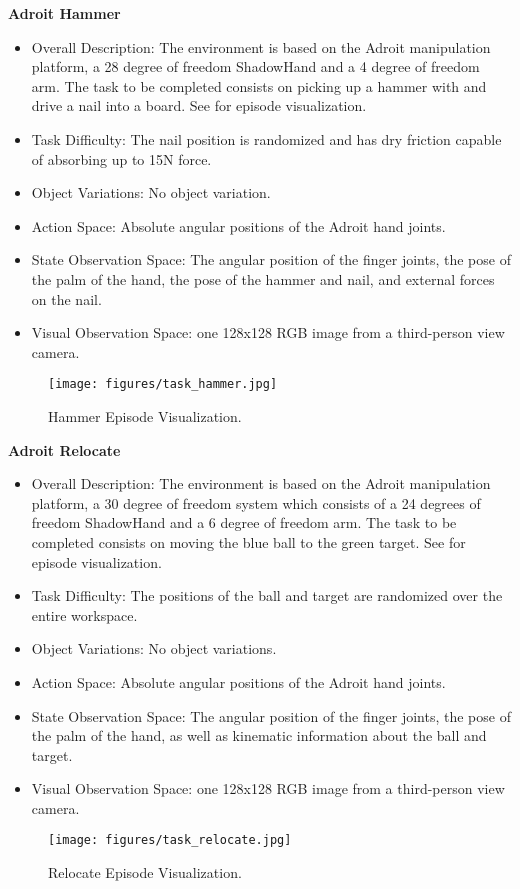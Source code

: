 \textbf{Adroit Hammer}
\begin{itemize}
    \item Overall Description: The environment is based on the Adroit manipulation platform, a 28 degree of freedom ShadowHand and a 4 degree of freedom arm. The task to be completed consists on picking up a hammer with and drive a nail into a board. See  for episode visualization.
    \item Task Difficulty: The nail position is randomized and has dry friction capable of absorbing up to 15N force.
    \item Object Variations: No object variation.
    \item Action Space: Absolute angular positions of the Adroit hand joints.
    \item State Observation Space: The angular position of the finger joints, the pose of the palm of the hand, the pose of the hammer and nail, and external forces on the nail.
    \item Visual Observation Space: one 128x128 RGB image from a third-person view camera. 
\end{itemize}
\begin{figure}[!ht]
    \centering
    \texttt{[image: figures/task\_hammer.jpg]}
    \caption{Hammer Episode Visualization.}
    \label{fig:task_hammer}
\end{figure}

\textbf{Adroit Relocate}
\begin{itemize}
    \item Overall Description: The environment is based on the Adroit manipulation platform, a 30 degree of freedom system which consists of a 24 degrees of freedom ShadowHand and a 6 degree of freedom arm. The task to be completed consists on moving the blue ball to the green target. See  for episode visualization.
    \item Task Difficulty: The positions of the ball and target are randomized over the entire workspace.
    \item Object Variations: No object variations.
    \item Action Space: Absolute angular positions of the Adroit hand joints.
    \item State Observation Space: The angular position of the finger joints, the pose of the palm of the hand, as well as kinematic information about the ball and target.
    \item Visual Observation Space: one 128x128 RGB image from a third-person view camera.
\end{itemize}
\begin{figure}[!ht]
    \centering
    \texttt{[image: figures/task\_relocate.jpg]}
    \caption{Relocate Episode Visualization.}
    \label{fig:task_relocate}
\end{figure}

